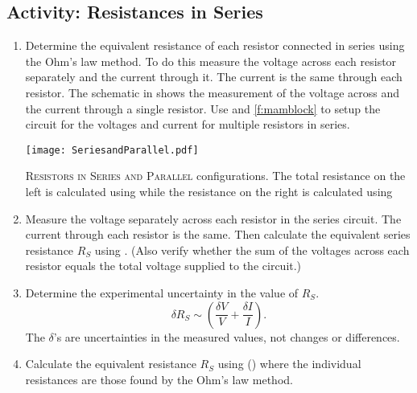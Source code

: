 \subsection{Activity: Resistances in Series} \label{s:series}
\begin{enumerate}
	\item \label{l:eqs} Determine the equivalent resistance of each resistor connected in series using the Ohm's law method. To do this measure the voltage across each resistor separately and the current through it. The current is the same through each resistor. The schematic in  shows the measurement of the voltage across and the current through a single resistor. Use  and \ref{f:mamblock} to setup the circuit for the voltages and current for multiple resistors in series.
	
\begin{marginfigure}
	\centering
	\texttt{[image: SeriesandParallel.pdf]}
	\caption[Series and Parallel Resistors]{\textsc{Resistors in Series and Parallel} configurations.  The total resistance on the left is calculated using  while the resistance on the right is calculated using }
	\label{f:resistor-series-par}
\end{marginfigure}

	\item Measure the voltage separately across each resistor in the series circuit. The current through each resistor is the same. Then calculate the equivalent series resistance $R_S$ using . (Also verify whether the sum of the voltages across each resistor equals the total voltage supplied to the circuit.)
	\item Determine the experimental uncertainty in the value of $R_S$. %
	\[ \delta R_{S} \sim \left( \frac{\delta V}{V} + \frac{\delta I}{I} \right). \] 
	The $\delta$'s are uncertainties  in the measured values, not changes or differences.
	
	\item Calculate the equivalent resistance $R_S$ using () where the individual resistances are those found by the Ohm's law method. %
\end{enumerate}



